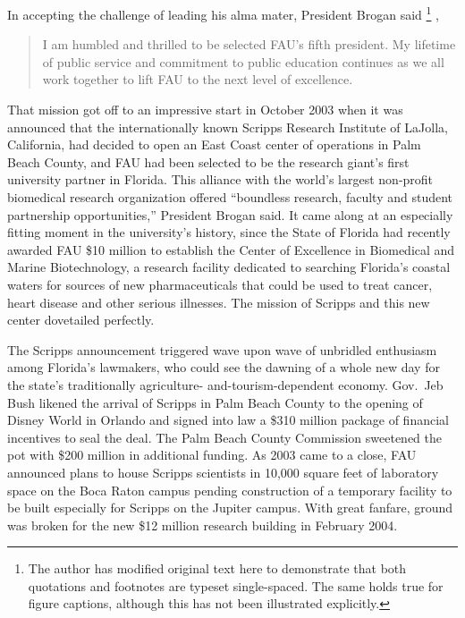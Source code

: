 \documentclass{article}
\begin{document}
In accepting the challenge of leading his alma mater, President Brogan said\relax
%
\footnote{The author has modified original text here to demonstrate that both quotations and footnotes are typeset single-spaced.  The same holds true for figure captions, although this has not been illustrated explicitly.}\relax
%
,
%
\begin{quotation}
I am humbled and thrilled to be selected FAU's fifth president. My lifetime of public service and commitment to public education continues as we all work together to lift FAU to the next level of excellence.
\end{quotation}
%
That mission got off to an impressive start in October 2003 when it was announced that the internationally known Scripps Research Institute of LaJolla, California, had decided to open an East Coast center of operations in Palm Beach County, and FAU had been selected to be the research giant's first university partner in Florida.  This alliance with the world's largest non-profit biomedical research organization offered ``boundless research, faculty and student partnership opportunities,'' President Brogan said.  It came along at an especially fitting moment in the university's history, since the State of Florida had recently awarded FAU \$10 million to establish the Center of Excellence in Biomedical and Marine Biotechnology, a research facility dedicated to searching Florida's coastal waters for sources of new pharmaceuticals that could be used to treat cancer, heart disease and other serious illnesses. The mission of Scripps and this new center dovetailed perfectly.

The Scripps announcement triggered wave upon wave of unbridled enthusiasm among Florida's lawmakers, who could see the dawning of a whole new day for the state's traditionally agriculture- and-tourism-dependent economy.  Gov.\ Jeb Bush likened the arrival of Scripps in Palm Beach County to the opening of Disney World in Orlando and signed into law a \$310 million package of financial incentives to seal the deal.  The Palm Beach County Commission sweetened the pot with \$200 million in additional funding.  As 2003 came to a close, FAU announced plans to house Scripps scientists in 10,000 square feet of laboratory space on the Boca Raton campus pending construction of a temporary facility to be built especially for Scripps on the Jupiter campus.  With great fanfare, ground was broken for the new \$12 million research building in February 2004.
\end{document}
